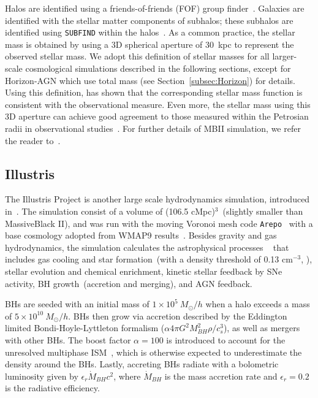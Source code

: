 \documentclass[twocolumn]{aastex631}
\begin{document}
Halos are identified using a friends-of-friends (FOF) group finder~\citep{1985ApJ...292..371D}. Galaxies are identified with the stellar matter components of subhalos; these subhalos are identified using {\tt SUBFIND} within the halos~\citep{2005MNRAS.364.1105S}. As a common practice, the stellar mass is obtained by using a 3D spherical aperture of 30~kpc to represent the observed stellar mass.
We adopt this definition of stellar masses for all larger-scale cosmological simulations described in the following sections, except for Horizon-AGN which use total mass (see Section~\ref{subsec:Horizon}) for details.  Using this definition, \citet{Pillepich2018} has shown that the corresponding stellar mass function is consistent with the observational measure. Even more, the stellar mass using this 3D aperture can achieve good agreement to those measured within the Petrosian radii in observational studies~\citep{Schaye2015}. For further details of MBII simulation, we refer the reader to~\citet{Khandai2015}.

\subsection{Illustris}
The Illustris Project is another large scale hydrodynamics simulation, introduced in~\citet{Genel2014, 2014MNRAS.444.1518V, 2014Natur.509..177V, Sijacki2015, Nelson2015}. The simulation consist of a volume of (106.5 cMpc)$^3$~(slightly smaller than MassiveBlack II), 
and was run with the moving Voronoi mesh code {\tt Arepo}~\citep{2010MNRAS.401..791S} with a base cosmology adopted from WMAP9 results~\citep{2013ApJS..208...19H}. Besides gravity and gas hydrodynamics, the simulation calculates the astrophysical processes ~\citep{2013MNRAS.436.3031V, 2014MNRAS.438.1985T} that includes gas cooling and star formation~(with a density threshold of 0.13 cm$^{-3}$, \citealt{2003MNRAS.339..289S}), stellar evolution and chemical enrichment, kinetic stellar feedback by SNe activity, BH growth~(accretion and merging), and AGN feedback.

BHs are seeded with an initial mass of $1 \times 10^5~M_{\odot}/h$ when a halo exceeds a mass of $5 \times 10^{10}~M_{\odot}/h$. BHs then grow via accretion described by the Eddington limited Bondi-Hoyle-Lyttleton formalism ($\alpha4\pi G^2M_{BH}^2 \rho/c_s^3$), as well as mergers with other BHs. The boost factor $\alpha=100$ is introduced to account for the unresolved multiphase ISM~\citep{Springel2005, 2009MNRAS.398...53B}, which is otherwise expected to underestimate the density around the BHs. Lastly, accreting BHs radiate with a bolometric luminosity given by $\epsilon_r \dot{M}_{BH}c^2$, where $\dot{M}_{BH}$ is the mass accretion rate and $\epsilon_r=0.2$ is the radiative efficiency.
\end{document}
